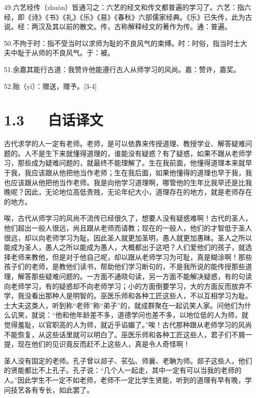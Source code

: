 \documentclass[letterpaper,12pt,english]{sphinxmanual}
\begin{document}
49.六艺经传（zhuàn）皆通习之：六艺的经文和传文都普遍的学习了。六艺：指六经，即《诗》《书》《礼》《乐》《易》《春秋》六部儒家经典。《乐》已失传，此为古说。经：两汉及其以前的散文。传，古称解释经文的著作为传。通：普遍。

50.不拘于时：指不受当时以求师为耻的不良风气的束缚。时：时俗，指当时士大夫中耻于从师的不良风气。于：被。

51.余嘉其能行古道：我赞许他能遵行古人从师学习的风尚。嘉：赞许，嘉奖。

52.贻（yí）：赠送，赠予。{[}3-4{]}


\section{1.3   白话译文}
\label{\detokenize{p01_u6563_u6587/_u97e9_u6108-_u5e08_u8bf4:id5}}
古代求学的人一定有老师。老师，是可以依靠来传授道理、教授学业、解答疑难问题的。人不是生下来就懂得道理的，谁能没有疑惑？有了疑惑，如果不跟从老师学习，那些成为疑难问题的，就最终不能理解了。生在我前面，他懂得道理本来就早于我，我应该跟从他把他当作老师；生在我后面，如果他懂得的道理也早于我，我也应该跟从他把他当作老师。我是向他学习道理啊，哪管他的生年比我早还是比我晚呢？因此，无论地位高低贵贱，无论年纪大小，道理存在的地方，就是老师存在的地方。

唉，古代从师学习的风尚不流传已经很久了，想要人没有疑惑难啊！古代的圣人，他们超出一般人很远，尚且跟从老师而请教；现在的一般人，他们的才智低于圣人很远，却以向老师学习为耻。因此圣人就更加圣明，愚人就更加愚昧。圣人之所以能成为圣人，愚人之所以能成为愚人，大概都出于这吧？人们爱他们的孩子，就选择老师来教他，但是对于他自己呢，却以跟从老师学习为可耻，真是糊涂啊！那些孩子们的老师，是教他们读书，帮助他们学习断句的，不是我所说的能传授那些道理，解答那些疑难问题的。一方面不通晓句读，另一方面不能解决疑惑，有的句读向老师学习，有的疑惑却不向老师学习；小的方面倒要学习，大的方面反而放弃不学，我没看出那种人是明智的。巫医乐师和各种工匠这些人，不以互相学习为耻。士大夫这类人，听到称“老师”称“弟子”的，就成群聚在一起讥笑人家。问他们为什么讥笑，就说：“他和他年龄差不多，道德学问也差不多，以地位低的人为师，就觉得羞耻，以官职高的人为师，就近乎谄媚了。”唉！古代那种跟从老师学习的风尚不能恢复，从这些话里就可以明白了。巫医乐师和各种工匠这些人，君子们不屑一提，现在他们的见识竟反而赶不上这些人，真是令人奇怪啊！

圣人没有固定的老师。孔子曾以郯子、苌弘、师襄、老聃为师。郯子这些人，他们的贤能都比不上孔子。孔子说：“几个人一起走，其中一定有可以当我的老师的人。”因此学生不一定不如老师，老师不一定比学生贤能，听到的道理有早有晚，学问技艺各有专长，如此罢了。
\end{document}
